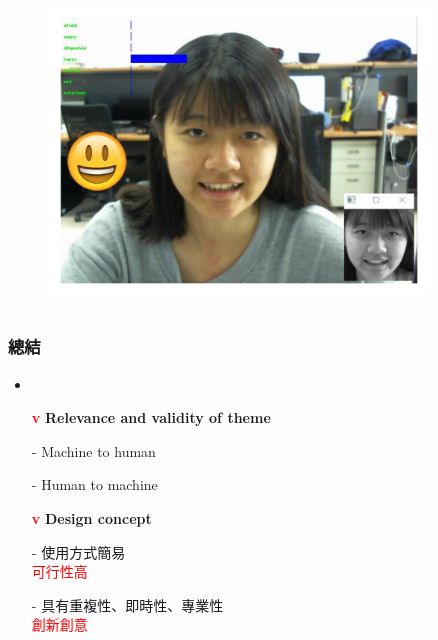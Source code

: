 \documentclass[10pt, conference, compsocconf]{beamer}
\begin{document}
\begin{CJK}{UTF8}{}
\begin{frame}
\begin{columns}
\begin{figure}[!t]
\begin{flushright}
\includegraphics[width=0.9\textwidth]{Figures/DetectResult.pdf}
\end{flushright}
\end{figure}
\end{columns}

\end{frame}

\begin{frame}
\frametitle{總結}
\begin{itemize}
\item{}
\end{itemize}
\begin{itemize}
\item[\Large\bf \textcolor{red}v] \Large\bf Relevance and validity of theme
\end{itemize}
\begin{itemize}
\item[-]  Machine to human
\item[-]  Human to machine
\end{itemize}

\begin{itemize}
\item[\Large\bf \textcolor{red}v] \Large\bf Design concept
\end{itemize}
\begin{itemize}
\item[-]  使用方式簡易\\
\textcolor{red}{可行性高}
\item[-]  具有重複性、即時性、專業性\\
\textcolor{red}{創新創意}
\end{itemize}
\end{frame}


\end{CJK}
\end{document}
